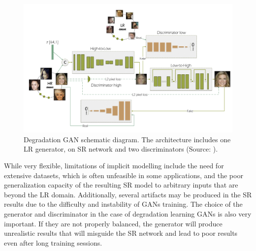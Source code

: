         \begin{figure}[H]
            \centering
            \includegraphics[width=\textwidth]{Includes/2-degradation-gan.png}
            \caption{Degradation GAN schematic diagram. The architecture includes one LR generator, on SR network and two discriminators (Source: \cite{bulat2018learn}).}    
            \label{fig:2-degradation-gan}
        \end{figure}
        
    
        While very flexible, limitations of implicit modelling include the need for extensive datasets, which is often unfeasible in some applications, and the poor generalization capacity of the resulting SR model to arbitrary inputs that are beyond the LR domain. 
        Additionally, several artifacts may be produced in the SR results due to the difficulty and instability of GANs training.
        The choice of the generator and discriminator in the case of degradation learning GANs is also very important. If they are not properly balanced, the generator will produce unrealistic results that will misguide the SR network and lead to poor results even after long training sessions.

         
\clearpage